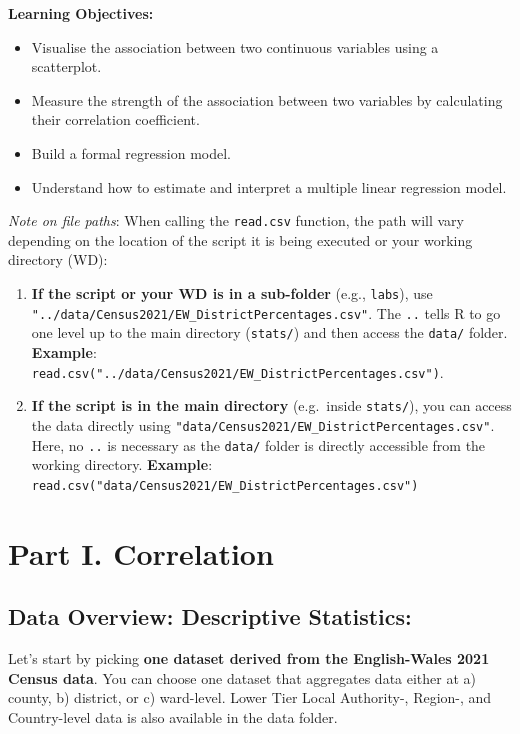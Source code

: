 \documentclass[
  letterpaper,
  DIV=11,
  numbers=noendperiod]{scrreprt}
\providecommand{\tightlist}{%
  \setlength{\itemsep}{0pt}\setlength{\parskip}{0pt}}\usepackage{longtable,booktabs,array}
\begin{document}
\textbf{Learning Objectives:}

\begin{itemize}
\tightlist
\item
  Visualise the association between two continuous variables using a
  scatterplot.
\item
  Measure the strength of the association between two variables by
  calculating their correlation coefficient.
\item
  Build a formal regression model.
\item
  Understand how to estimate and interpret a multiple linear regression
  model.
\end{itemize}

\emph{Note on file paths}: When calling the \texttt{read.csv} function,
the path will vary depending on the location of the script it is being
executed or your working directory (WD):

\begin{enumerate}
\def\labelenumi{\arabic{enumi}.}
\tightlist
\item
  \textbf{If the script or your WD is in a sub-folder} (e.g.,
  \texttt{labs}), use
  \texttt{"../data/Census2021/EW\_DistrictPercentages.csv"}. The
  \texttt{..} tells R to go one level up to the main directory
  (\texttt{stats/}) and then access the \texttt{data/} folder.
  \textbf{Example}:
  \texttt{read.csv("../data/Census2021/EW\_DistrictPercentages.csv")}.
\item
  \textbf{If the script is in the main directory} (e.g.~inside
  \texttt{stats/}), you can access the data directly using
  \texttt{"data/Census2021/EW\_DistrictPercentages.csv"}. Here, no
  \texttt{..} is necessary as the \texttt{data/} folder is directly
  accessible from the working directory. \textbf{Example}:
  \texttt{read.csv("data/Census2021/EW\_DistrictPercentages.csv")}
\end{enumerate}

\section{Part I. Correlation}\label{part-i.-correlation}

\subsection{Data Overview: Descriptive
Statistics:}\label{data-overview-descriptive-statistics}

Let's start by picking \textbf{one dataset derived from the
English-Wales 2021 Census data}. You can choose one dataset that
aggregates data either at a) county, b) district, or c) ward-level.
Lower Tier Local Authority-, Region-, and Country-level data is also
available in the data folder.
\end{document}
